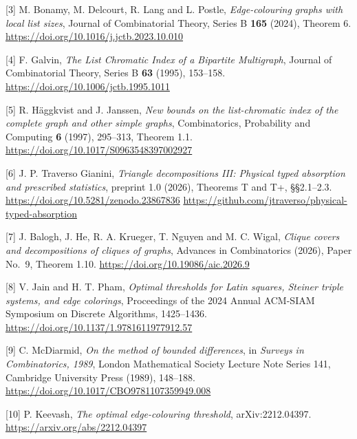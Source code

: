 \documentclass[english,11pt,a4paper]{article}
\begin{document}
{[}3{]} M. Bonamy, M. Delcourt, R. Lang and L. Postle, \emph{Edge-colouring graphs with local list sizes}, Journal of Combinatorial Theory, Series B \textbf{165} (2024), Theorem 6. \url{https://doi.org/10.1016/j.jctb.2023.10.010}

{[}4{]} F. Galvin, \emph{The List Chromatic Index of a Bipartite Multigraph}, Journal of Combinatorial Theory, Series B \textbf{63} (1995), 153--158. \url{https://doi.org/10.1006/jctb.1995.1011}

{[}5{]} R. Häggkvist and J. Janssen, \emph{New bounds on the list-chromatic index of the complete graph and other simple graphs}, Combinatorics, Probability and Computing \textbf{6} (1997), 295--313, Theorem 1.1. \url{https://doi.org/10.1017/S0963548397002927}

{[}6{]} J. P. Traverso Gianini, \emph{Triangle decompositions III: Physical typed absorption and prescribed statistics}, preprint 1.0 (2026), Theorems T and T+, §§2.1--2.3. \url{https://doi.org/10.5281/zenodo.23867836} \url{https://github.com/jtraverso/physical-typed-absorption}

{[}7{]} J. Balogh, J. He, R. A. Krueger, T. Nguyen and M. C. Wigal, \emph{Clique covers and decompositions of cliques of graphs}, Advances in Combinatorics (2026), Paper No.~9, Theorem 1.10. \url{https://doi.org/10.19086/aic.2026.9}

{[}8{]} V. Jain and H. T. Pham, \emph{Optimal thresholds for Latin squares, Steiner triple systems, and edge colorings}, Proceedings of the 2024 Annual ACM-SIAM Symposium on Discrete Algorithms, 1425--1436. \url{https://doi.org/10.1137/1.9781611977912.57}

{[}9{]} C. McDiarmid, \emph{On the method of bounded differences}, in \emph{Surveys in Combinatorics, 1989}, London Mathematical Society Lecture Note Series 141, Cambridge University Press (1989), 148--188. \url{https://doi.org/10.1017/CBO9781107359949.008}

{[}10{]} P. Keevash, \emph{The optimal edge-colouring threshold}, arXiv:2212.04397. \url{https://arxiv.org/abs/2212.04397}
\end{document}
